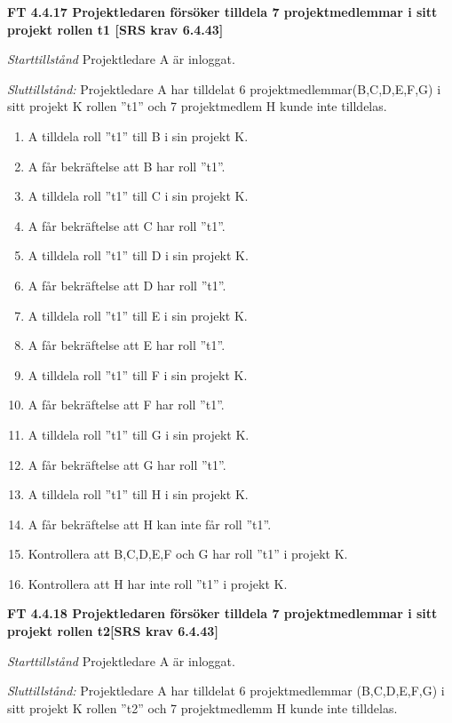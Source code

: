 \documentclass[a4paper]{article}
\begin{document}
\textbf{FT 4.4.17 Projektledaren försöker tilldela 7 projektmedlemmar i sitt projekt rollen t1 [SRS krav 6.4.43]}

\emph{Starttillstånd} Projektledare A är inloggat.

\emph{Sluttillstånd:} Projektledare A  har tilldelat 6  projektmedlemmar(B,C,D,E,F,G) i sitt projekt K  rollen ''t1'' och 7 projektmedlem H kunde inte tilldelas.

\begin{enumerate}
\item A tilldela roll ”t1” till B i sin projekt K. 
\item  A får bekräftelse att B har roll ”t1”.
\item A tilldela roll ”t1” till C i sin projekt K. 
\item A får bekräftelse att C har roll ”t1”.
\item A tilldela roll ”t1” till D i sin projekt K. 
\item A får bekräftelse att D har roll ”t1”.
\item A tilldela roll ”t1” till E i sin projekt K. 
\item A får bekräftelse att E har roll ”t1”.
\item A tilldela roll ”t1” till F i sin projekt K.
\item A får bekräftelse att F har roll ”t1”.
\item A tilldela roll ”t1” till G i sin projekt K. 
\item A får bekräftelse att G har roll ”t1”.
\item A tilldela roll ”t1” till H i sin projekt K. 
\item A får bekräftelse att  H kan inte får roll ”t1”.
\item Kontrollera att B,C,D,E,F och G har roll ”t1” i projekt K.
\item Kontrollera att H har inte roll ”t1” i projekt K.
\end{enumerate}

\textbf{FT 4.4.18 Projektledaren försöker tilldela 7 projektmedlemmar i sitt projekt rollen t2[SRS krav 6.4.43]}

\emph{Starttillstånd} Projektledare A är inloggat.

\emph{Sluttillstånd:} Projektledare A  har tilldelat 6 projektmedlemmar (B,C,D,E,F,G) i sitt projekt K  rollen ''t2'' och 7 projektmedlemm H kunde inte tilldelas.
\end{document}
